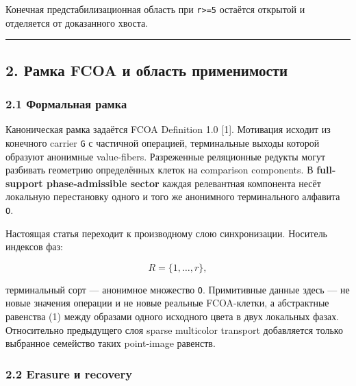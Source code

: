 Конечная предстабилизационная область при \texttt{r\textgreater{}=5}
остаётся открытой и отделяется от доказанного хвоста.

\begin{center}\rule{0.5\linewidth}{0.5pt}\end{center}

\hypertarget{ux440ux430ux43cux43aux430-fcoa-ux438-ux43eux431ux43bux430ux441ux442ux44c-ux43fux440ux438ux43cux435ux43dux438ux43cux43eux441ux442ux438}{%
\subsection{2. Рамка FCOA и область
применимости}\label{ux440ux430ux43cux43aux430-fcoa-ux438-ux43eux431ux43bux430ux441ux442ux44c-ux43fux440ux438ux43cux435ux43dux438ux43cux43eux441ux442ux438}}

\hypertarget{ux444ux43eux440ux43cux430ux43bux44cux43dux430ux44f-ux440ux430ux43cux43aux430}{%
\subsubsection{2.1 Формальная
рамка}\label{ux444ux43eux440ux43cux430ux43bux44cux43dux430ux44f-ux440ux430ux43cux43aux430}}

Каноническая рамка задаётся FCOA Definition 1.0 {[}1{]}. Мотивация
исходит из конечного carrier \texttt{G} с частичной операцией,
терминальные выходы которой образуют анонимные value-fibers. Разреженные
реляционные редукты могут разбивать геометрию определённых клеток на
comparison components. В \textbf{full-support phase-admissible sector}
каждая релевантная компонента несёт локальную перестановку одного и того
же анонимного терминального алфавита \texttt{O}.

Настоящая статья переходит к производному слою синхронизации. Носитель
индексов фаз:

\[
R=\{1,\ldots,r\},
\]

терминальный сорт --- анонимное множество \texttt{O}. Примитивные данные
здесь --- не новые значения операции и не новые реальные FCOA-клетки, а
абстрактные равенства (1) между образами одного исходного цвета в двух
локальных фазах. Относительно предыдущего слоя sparse multicolor
transport добавляется только выбранное семейство таких point-image
равенств.

\hypertarget{erasure-ux438-recovery}{%
\subsubsection{2.2 Erasure и recovery}\label{erasure-ux438-recovery}}

